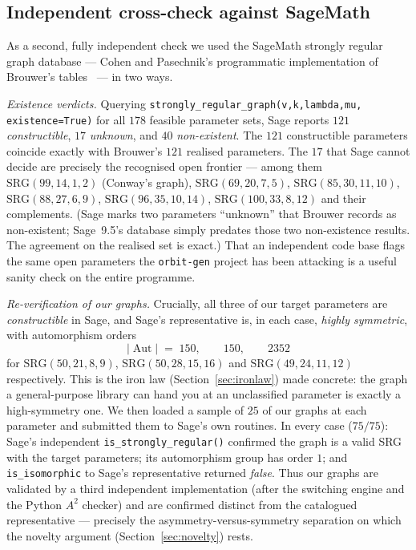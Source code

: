 \documentclass[11pt]{article}
\theoremstyle{definition}
\newcommand{\SRG}[1]{\mathrm{SRG}(#1)}
\newcommand{\Aut}{\operatorname{Aut}}
\begin{document}
\subsection{Independent cross-check against SageMath}\label{sec:sage}

As a second, fully independent check we used the SageMath strongly regular graph database
--- Cohen and Pasechnik's programmatic implementation of Brouwer's
tables~\cite{cohen-pasechnik} --- in two ways.

\emph{Existence verdicts.} Querying
\verb|strongly_regular_graph(v,k,lambda,mu, existence=True)| for all $178$ feasible
parameter sets, Sage reports $121$ \emph{constructible}, $17$ \emph{unknown}, and $40$
\emph{non-existent}. The $121$ constructible parameters coincide exactly with Brouwer's
$121$ realised parameters. The $17$ that Sage cannot decide are precisely the recognised
open frontier --- among them $\SRG{99,14,1,2}$ (Conway's graph), $\SRG{69,20,7,5}$,
$\SRG{85,30,11,10}$, $\SRG{88,27,6,9}$, $\SRG{96,35,10,14}$, $\SRG{100,33,8,12}$ and their
complements. (Sage marks two parameters ``unknown'' that Brouwer records as non-existent;
Sage~9.5's database simply predates those two non-existence results. The agreement on the
realised set is exact.) That an independent code base flags the same open parameters the
\texttt{orbit-gen} project has been attacking is a useful sanity check on the entire
programme.

\emph{Re-verification of our graphs.} Crucially, all three of our target parameters are
\emph{constructible} in Sage, and Sage's representative is, in each case, \emph{highly
symmetric}, with automorphism orders
\[
  |\Aut| \;=\; 150,\qquad 150,\qquad 2352
\]
for $\SRG{50,21,8,9}$, $\SRG{50,28,15,16}$ and $\SRG{49,24,11,12}$ respectively.
This is the iron law (Section~\ref{sec:ironlaw}) made concrete: the graph a general-purpose
library can hand you at an unclassified parameter is exactly a high-symmetry one. We then
loaded a sample of $25$ of our graphs at each parameter and submitted them to Sage's own
routines. In every case ($75/75$): Sage's independent \verb|is_strongly_regular()| confirmed
the graph is a valid SRG with the target parameters; its automorphism group has order $1$;
and \verb|is_isomorphic| to Sage's representative returned \emph{false}. Thus our graphs are
validated by a third independent implementation (after the switching engine and the Python
$A^2$ checker) and are confirmed distinct from the catalogued representative --- precisely
the asymmetry-versus-symmetry separation on which the novelty argument
(Section~\ref{sec:novelty}) rests.
\end{document}
